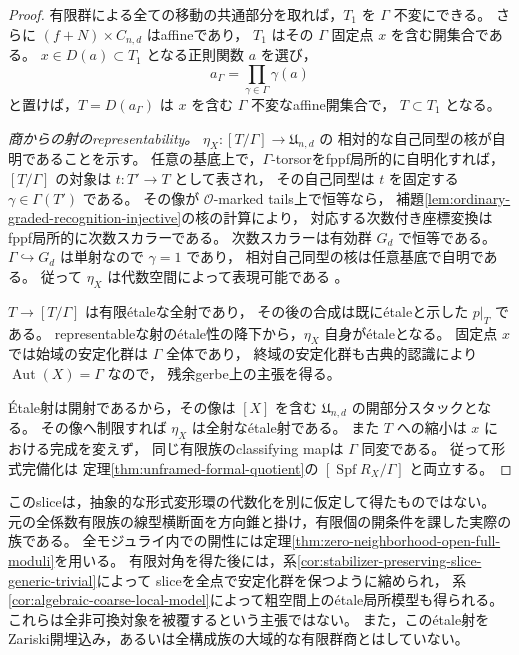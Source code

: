 \begin{proof}
有限群による全ての移動の共通部分を取れば，$T_1$ を $\Gamma$ 不変にできる。
さらに $(f+N)\times C_{n,d}$ はaffineであり，
$T_1$ はその $\Gamma$ 固定点 $x$ を含む開集合である。
$x\in D(a)\subset T_1$ となる正則関数 $a$ を選び，
\[
                         a_\Gamma=\prod_{\gamma\in\Gamma}\gamma(a)
\]
と置けば，$T=D(a_\Gamma)$ は $x$ を含む $\Gamma$ 不変なaffine開集合で，
$T\subset T_1$ となる。

\emph{商からの射のrepresentability。}
$\eta_X:[T/\Gamma]\to\mathfrak U_{n,d}$ の
相対的な自己同型の核が自明であることを示す。
任意の基底上で，$\Gamma$-torsorをfppf局所的に自明化すれば，
$[T/\Gamma]$ の対象は $t:T'\to T$ として表され，
その自己同型は $t$ を固定する $\gamma\in\Gamma(T')$ である。
その像が $\mathcal O$-marked tails上で恒等なら，
補題\ref{lem:ordinary-graded-recognition-injective}の核の計算により，
対応する次数付き座標変換はfppf局所的に次数スカラーである。
次数スカラーは有効群 $G_d$ で恒等である。
$\Gamma\hookrightarrow G_d$ は単射なので $\gamma=1$ であり，
相対自己同型の核は任意基底で自明である。
従って $\eta_X$ は代数空間によって表現可能である
\cite[Lemma~101.6.2, Tag~04YY]{StacksProject}。

$T\to[T/\Gamma]$ は有限\'{e}taleな全射であり，
その後の合成は既に\'{e}taleと示した $p|_T$ である。
representableな射の\'{e}tale性の降下から，$\eta_X$ 自身が\'{e}taleとなる。
固定点 $x$ では始域の安定化群は $\Gamma$ 全体であり，
終域の安定化群も古典的認識により $\operatorname{Aut}(X)=\Gamma$ なので，
残余gerbe上の主張を得る。

\'{E}tale射は開射であるから，その像は $[X]$ を含む
$\mathfrak U_{n,d}$ の開部分スタックとなる。
その像へ制限すれば $\eta_X$ は全射な\'{e}tale射である。
また $T$ への縮小は $x$ における完成を変えず，
同じ有限族のclassifying mapは $\Gamma$ 同変である。
従って形式完備化は
定理\ref{thm:unframed-formal-quotient}の
$[\operatorname{Spf}R_X/\Gamma]$ と両立する。
\end{proof}

\begin{remark}
このsliceは，抽象的な形式変形環の代数化を別に仮定して得たものではない。
元の全係数有限族の線型横断面を方向錐と掛け，有限個の開条件を課した実際の族である。
全モジュライ内での開性には定理\ref{thm:zero-neighborhood-open-full-moduli}を用いる。
有限対角を得た後には，系\ref{cor:stabilizer-preserving-slice-generic-trivial}によって
sliceを全点で安定化群を保つように縮められ，
系\ref{cor:algebraic-coarse-local-model}によって粗空間上の\'{e}tale局所模型も得られる。
これらは全非可換対象を被覆するという主張ではない。
また，この\'{e}tale射をZariski開埋込み，あるいは全構成族の大域的な有限群商とはしていない。
\end{remark}


